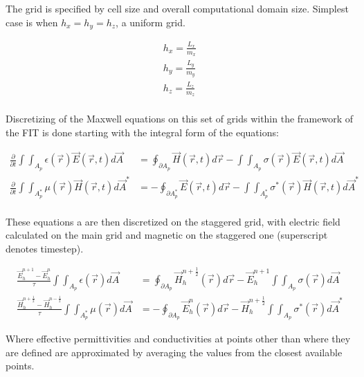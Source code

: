             The grid is specified by cell size and overall computational domain size.
            Simplest case is when $h_x = h_y = h_z$, a uniform grid.

            \begin{align}
                h_x = \frac{L_x}{m_x} \\
                h_y = \frac{L_y}{m_y} \\
                h_z = \frac{L_z}{m_z} \\
            \end{align}

            Discretizing of the Maxwell equations on this set of grids within the framework of the
            FIT is done starting with the integral form of the equations:

            \begin{align}
                \frac{\partial}{\partial t}\int\int_{A_p} \epsilon(\vec{r})\vec{E}(\vec{r},t)d\vec{A}
                    &= \oint_{\partial A_p} \vec{H}(\vec{r}, t)d\vec{r} - \int\int_{A_p}\sigma(\vec{r})\vec{E}(\vec{r}, t)d\vec{A} \\
                \frac{\partial}{\partial t}\int\int_{A_p^*} \mu(\vec{r})\vec{H}(\vec{r}, t)d\vec{A}^*
                    &= -\oint_{\partial A_p^*} \vec{E}(\vec{r},t)d\vec{r} - \int\int_{A_p^*}\sigma^*(\vec{r})\vec{H}(\vec{r},t)d\vec{A}^*\\
            \end{align}

            These equations a are then discretized on the staggered grid, with electric field calculated on the main
            grid and magnetic on the staggered one (superscript denotes timestep).

            \begin{align}
                \frac{\vec{E}_h^{n+1} - \vec{E}_h^{n}}{\tau}\int\int_{A_p}\epsilon(\vec{r})d\vec{A}
                    &= \oint_{\partial A_p}\vec{H}_h^{n+\frac{1}{2}}(\vec{r})d\vec{r} - \vec{E}_h^{n+1}\int\int_{A_p}\sigma(\vec{r})d\vec{A} \\
                \frac{\vec{H}_h^{n+\frac{1}{2}} - \vec{H}_h^{n-\frac{1}{2}}}{\tau} \int\int_{A_p^*}\mu(\vec{r})d\vec{A}
                    &= - \oint_{\partial A_p}\vec{E}_h^{n}(\vec{r})d\vec{r} - \vec{H}_h^{n+\frac{1}{2}}\int\int_{A_p}\sigma^*(\vec{r})d\vec{A}^*
            \end{align}

            Where effective permittivities and conductivities at points other than where they are defined are
            approximated by averaging the values from the closest available points.

